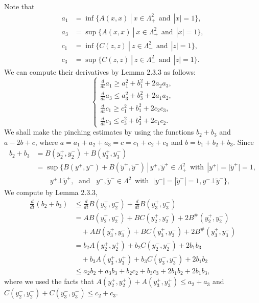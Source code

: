 Note that
\begin{align*}
a_1&=\inf\{A(x,x)\ |\  x\in \Lambda_+^2 \ \ \text{and} \ \ |x|=1\},\\
a_3&=\sup\{A(x,x)\ |\  x\in \Lambda_+^2 \ \ \text{and} \ \ |x|=1\},\\
c_1&=\inf\{C(z,z)\ |\  z\in \Lambda_-^2 \ \ \text{and} \ \ |z|=1\},\\
c_3&=\sup\{C(z,z)\ |\  z\in \Lambda_-^2 \ \ \text{and} \ \
|z|=1\}.
\end{align*}
We can compute their derivatives by Lemma 2.3.3 as follows: \begin{equation}
   \left\{
   \begin{array}{lll}
    \frac {d }{d t}a_1\geq a_1^2+b_1^2+2a_2a_3,
         \\[3mm]
    \frac {d }{d t}a_3\leq a_3^2+b_3^2+2a_1a_2,
         \\[3mm]
    \frac {d }{d t}c_1\geq c_1^2+b_1^2+2c_2c_3,
         \\[3mm]
    \frac {d }{d t}c_3\leq c_3^2+b_3^2+2c_1c_2.
\end{array}
\right. %
\end{equation} We shall make the pinching estimates by using the functions
$b_2+b_3$ and $a-2b+c$, where $a=a_1+a_2+a_3=c=c_1+c_2+c_3$ and
$b=b_1+b_2+b_3$. Since
\begin{align*}
b_2+b_3&  =B(y_2^+,y_2^-)+B(y_3^+,y_3^-) \\
&  = \sup\{B(y^+,y^-)+B(\tilde{y}^+,\tilde{y}^-)\, | \,
y^+,\tilde{y}^+\in \Lambda_+^2 \ \ \text{with} \ \
|y^+|=|\tilde{y}^+|=1,\\
&\qquad y^+ \bot \tilde{y}^+, \;\text{ and } \; \
y^-,\tilde{y}^-\in \Lambda_-^2 \;\text{with } \;
|y^-|=|\tilde{y}^-|=1,  y^- \bot \tilde{y}^- \},
\end{align*}
We compute by Lemma 2.3.3,
\begin{align}
\frac{d}{dt}(b_2+b_3)& \leq
\frac{d}{dt}B(y_2^+,y_2^-)+\frac{d}{dt}B(y_3^+,y_3^-)\\
&  = AB(y_2^+,y_2^-)+BC(y_2^+,y_2^-)+2B^\#(y_2^+,y_2^-) \nonumber\\
&\quad +AB(y_3^+,y_3^-)+BC(y_3^+,y_3^-)+2B^\#(y_3^+,y_3^-) \nonumber\\
&  = b_2A(y_2^+,y_2^+)+b_2C(y_2^-,y_2^-)+2b_1b_3 \nonumber\\
&\quad +b_3A(y_3^+,y_3^+)+b_3C(y_3^-,y_3^-)+2b_1b_2 \nonumber\\
&  \leq a_2b_2+a_3b_3+b_2c_2+b_3c_3+2b_1b_2+2b_1b_3,\nonumber
\end{align} %
where we used the facts that $A(y_2^+,y_2^+)+A(y_3^+,y_3^+)\leq
a_2+a_3$ and $C(y_2^-,y_2^-)+C(y_3^-,y_3^-)\leq c_2+c_3$.

